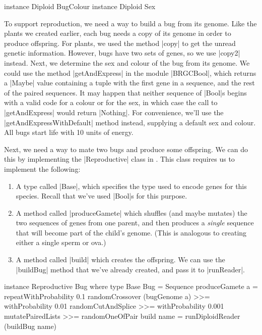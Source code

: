 \begin{code}
instance Diploid BugColour
instance Diploid Sex
\end{code} 

To support reproduction, we need a way to build a bug from its genome.
Like the plants we created earlier, each bug needs a copy of its genome in order to produce offspring.
For plants, we used the method |copy| to get the unread genetic information.
However, bugs have two sets of genes, so we use |copy2| instead.
Next, we determine the sex and colour of the bug from its genome.
We could use the method |getAndExpress| in the module |BRGCBool|, 
which returns a |Maybe| value containing a tuple with the first gene in a sequence,
and the rest of the paired sequences.
It may happen that neither sequence of |Bool|s begins with
a valid code for a colour or for the sex, in which case the call to |getAndExpress|
would return |Nothing|.
For convenience, we'll use the |getAndExpressWithDefault| method instead,
supplying a default sex and colour.
All bugs start life with 10 units of energy.

Next, we need a way to mate two bugs and produce some offspring.
We can do this by implementing the |Reproductive| class in 
.
This class requires us to implement the following:
\begin{enumerate}
\item A type called |Base|, which specifies the type used to encode
genes for this species. Recall that we've used |Bool|s for this purpose.
\item A method called |produceGamete| which shuffles (and maybe mutates)
the two sequences of genes from one parent, 
and then produces a \emph{single} sequence that will become part of the
child's genome.
(This is analogous to creating either a single sperm or ova.)
\item A method called |build| which creates the offspring.
We can use the |buildBug| method that we've already created,
and pass it to |runReader|.
\end {enumerate}

\begin{code}
instance Reproductive Bug where
  type Base Bug = Sequence
  produceGamete a = 
    repeatWithProbability 0.1 randomCrossover (bugGenome a) >>=
    withProbability 0.01 randomCutAndSplice >>=
    withProbability 0.001 mutatePairedLists >>=
    randomOneOfPair
  build name = runDiploidReader (buildBug name)
\end{code} 

